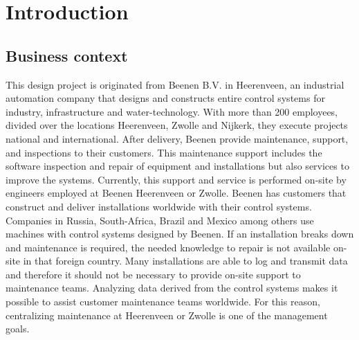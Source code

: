 
\chapter{Introduction} %

\label{Chapter1} %


\newcommand{\keyword}[1]{\textbf{#1}}
\newcommand{\tabhead}[1]{\textbf{#1}}
\newcommand{\code}[1]{\texttt{#1}}
\newcommand{\file}[1]{\texttt{\bfseries#1}}
\newcommand{\option}[1]{\texttt{\itshape#1}}


\section{Business context} \label{Business context}
This design project is originated from Beenen B.V. in Heerenveen, an industrial automation company that designs and constructs entire control systems for industry, infrastructure and water-technology. With more than 200 employees, divided over the locations Heerenveen, Zwolle and Nijkerk, they execute projects national and international. After delivery, Beenen provide maintenance, support, and inspections to their customers. This maintenance support includes the software inspection and repair of equipment and installations but also services to improve the systems. Currently, this support and service is performed on-site by engineers employed at Beenen Heerenveen or Zwolle. Beenen has customers that construct and deliver installations worldwide with their control systems. Companies in Russia, South-Africa, Brazil and Mexico among others use machines with control systems designed by Beenen. If an installation breaks down and maintenance is required, the needed knowledge to repair is not available on-site in that foreign country. Many installations are able to log and transmit data and therefore it should not be necessary to provide on-site support to maintenance teams. Analyzing data derived from the control systems makes it possible to assist customer maintenance teams worldwide. For this reason, centralizing maintenance at Heerenveen or Zwolle is one of the management goals.

